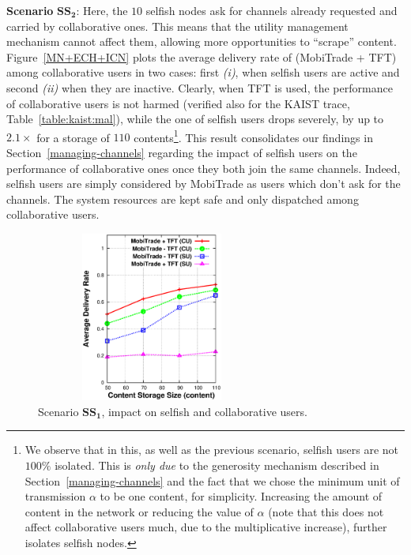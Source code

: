 \noindent \textbf{Scenario} $\mathbf{SS_2}$: Here, the $10$ selfish nodes ask for channels already requested and carried by collaborative ones. This means that the utility management mechanism cannot affect them, allowing more opportunities to ``scrape'' content. Figure~\ref{MN+ECH+ICN} plots the average delivery rate of (MobiTrade + TFT) among collaborative users in two cases: first \emph{(i)}, when selfish users are active and second \emph{(ii)} when they are inactive. Clearly, when TFT is used, the performance of collaborative users is not harmed (verified also for the KAIST trace, Table~\ref{table:kaist:mal}), while the one of selfish users drops severely, by up to $2.1\times$ for a storage of $110$ contents\footnote{We observe that in this, as well as the previous scenario, selfish users are not $100\%$ isolated. This is \emph{only due} to the generosity mechanism described in Section~\ref{managing-channels} and the fact that we chose the minimum unit of transmission $\alpha$ to be one content, for simplicity. Increasing the amount of content in the network or reducing the value of $\alpha$ (note that this does not affect collaborative users much, due to the multiplicative increase), further isolates selfish nodes.}. This result consolidates our findings in Section~\ref{managing-channels} regarding the impact of selfish users on the performance of collaborative ones once they both join the same channels. Indeed, selfish users are simply considered by MobiTrade as users which don't ask for the channels. The system resources are kept safe and only dispatched among collaborative users.

\begin{figure}[!h]
  \begin{center}
    \includegraphics[width=3in,height=2.2in]{Chapitre5/fig1.eps}
  \end{center}
  \caption{Scenario $\mathbf{SS_1}$, impact on selfish and collaborative users.}
  \label{SS-Scenario-1}
\end{figure}

